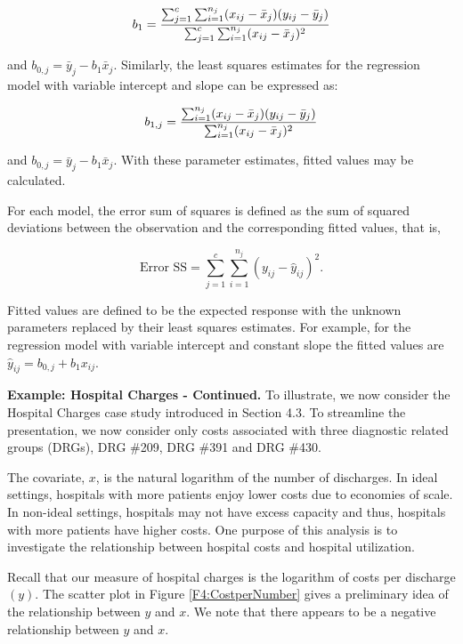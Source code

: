 \begin{equation*}
b_1=\frac{\sum_{j=1}^{c}\sum_{i=1}^{n_{j}}(x_{ij}-\bar{x}_{j})(y_{ij}-\bar{%
y}_{j})}{\sum_{j=1}^{c}\sum_{i=1}^{n_{j}}(x_{ij}-\bar{x}_{j})^{2}}
\end{equation*}

\noindent and $b_{0,j}=\bar{y}_{j}-b_1\bar{x}_{j}$. Similarly, the
least squares estimates for the regression model with variable
intercept and slope can be expressed as:

\begin{equation*}
b_{1,j}=\frac{\sum_{i=1}^{n_{j}}(x_{ij}-\bar{x}_{j})(y_{ij}-\bar{y}_{j})}{%
\sum_{i=1}^{n_{j}}(x_{ij}-\bar{x}_{j})^{2}}
\end{equation*}

\noindent and $b_{0,j}=\bar{y}_{j}-b_1\bar{x}_{j}$. With these
parameter estimates, fitted values may be calculated.

For each model, the error sum of squares is defined as the sum of
squared deviations between the observation and the corresponding
fitted values, that is,

\begin{equation*}
\text{Error
SS}=\sum_{j=1}^{c}\sum_{i=1}^{n_{j}}(y_{ij}-\hat{y}_{ij})^{2}.
\end{equation*}

\noindent Fitted values are defined to be the expected response with
the unknown parameters replaced by their least squares estimates.
For example, for the regression model with variable intercept and
constant slope the fitted values are
$\hat{y}_{ij}=b_{0,j}+b_1x_{ij}$.

\linejed

\textbf{Example: Hospital Charges - Continued.} To illustrate, we
now consider the Hospital Charges case study introduced in Section
4.3. To streamline the presentation, we now consider only costs
associated with three diagnostic related groups (DRGs), DRG \#209,
DRG \#391 and DRG \#430.

The covariate, $x$, is the natural logarithm of the number of
discharges. In ideal settings, hospitals with more patients enjoy
lower costs due to economies of scale. In non-ideal settings,
hospitals may not have excess capacity and thus, hospitals with more
patients have higher costs. One purpose of this analysis is to
investigate the relationship between hospital costs and hospital
utilization.

Recall that our measure of hospital charges is the logarithm of
costs per discharge $(y)$. The scatter plot in Figure
\ref{F4:CostperNumber} gives a preliminary idea of the relationship
between $y$ and $x$. We note that there appears to be a negative
relationship between $y$ and $x$.

